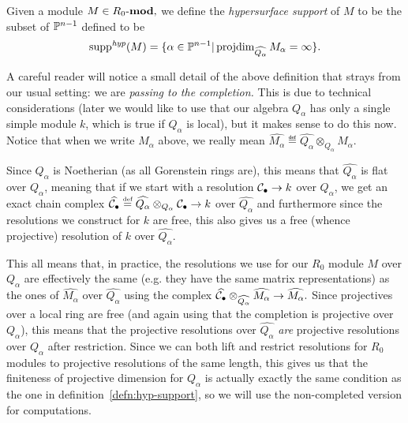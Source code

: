 \documentclass [11pt, proquest] {uwthesis}[2020/02/24]
\DeclareMathOperator{\supph}{supp^\mathit{hyp}}
\begin{document}
    \begin{defn}\label{defn:hyp-support}
        Given a module $M\in R_0\text{-}\mathbf{mod},$ we define the \emph{hypersurface support} of $M$ to be the subset of $\mathbb{P}^{n-1}$ defined to be
        \[\supph(M)=\{\alpha\in \bbP^{n-1}|\projdim_{\widehat{Q_\alpha}}M_\alpha = \infty\}.\]
    \end{defn}
    
    \begin{rmk} 
        A careful reader will notice a small detail of the above definition that strays from our usual setting: we are \textit{passing to the completion.} This is due to technical considerations (later we would like to use that our algebra $Q_\alpha$ has only a single simple module $k$, which is true if $Q_\alpha$ is local), but it makes sense to do this now. Notice that when we write $M_\alpha$ above, we really mean $\widehat{M_\alpha}\eqdef \widehat{Q_\alpha}\otimes_{Q_\alpha}M_\alpha.$ 
        
        Since $Q_\alpha$ is Noetherian (as all Gorenstein rings are), this means that $\widehat{Q_\alpha}$ is flat over $Q_\alpha$, meaning that if we start with a resolution $\mathcal{C}_\bullet\to k$ over $Q_\alpha$, we get an exact chain complex $\widehat{\mathcal{C}_\bullet}\stackrel{\text{\tiny def}}{=} \widehat{Q_\alpha}\otimes_{Q_\alpha}\mathcal{C}_\bullet\to k$ over $\widehat{Q_\alpha}$ and furthermore since the resolutions we construct for $k$ are free, this also gives us a free (whence projective) resolution of $k$ over $\widehat{Q_\alpha}$.
        
        This all means that, in practice, the resolutions we use for our $R_0$ module $M$ over $Q_\alpha$ are effectively the same (e.g. they have the same matrix representations) as the ones of $\widehat{M_\alpha}$ over $\widehat{Q_\alpha}$ using the complex $\widehat{\mathcal{C}_\bullet}\otimes_{\widehat{Q_\alpha}}\widehat{M_\alpha}\to \widehat{M_\alpha}.$ Since projectives over a local ring are free (and again using that the completion is projective over $Q_\alpha$), this means that the projective resolutions over $\widehat{Q_\alpha}$ \textit{are} projective resolutions over $Q_\alpha$ after restriction. Since we can both lift and restrict resolutions for $R_0$ modules to projective resolutions of the same length, this gives us that the finiteness of projective dimension for $Q_\alpha$ is actually exactly the same condition as the one in definition~\ref{defn:hyp-support}, so we will use the non-completed version for computations.
    \end{rmk}
\end{document}
